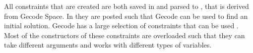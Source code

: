All constraints that are created are both saved in  and parsed to , that is derived 
from Gecode Space. In  they are posted such that Gecode can be used to find an initial solution. 
Gecode has a large selection of constraints that can be used \cite[p. 58-80]{MPG:M}. Most of the constructors of these 
constraints are overloaded such that they can take different arguments and works with different types of variables. 